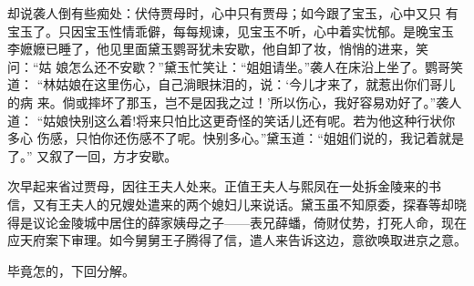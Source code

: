 却说袭人倒有些痴处：伏侍贾母时，心中只有贾母；如今跟了宝玉，心中又只
有宝玉了。只因宝玉性情乖僻，每每规谏，见宝玉不听，心中着实忧郁。是晚宝玉
李嬷嬷已睡了，他见里面黛玉鹦哥犹未安歇，他自卸了妆，悄悄的进来，笑问：“姑
娘怎么还不安歇？”黛玉忙笑让：“姐姐请坐。”袭人在床沿上坐了。鹦哥笑道：
“林姑娘在这里伤心，自己淌眼抹泪的，说：‘今儿才来了，就惹出你们哥儿的病
来。倘或摔坏了那玉，岂不是因我之过！’所以伤心，我好容易劝好了。”袭人道：
“姑娘快别这么着!将来只怕比这更奇怪的笑话儿还有呢。若为他这种行状你多心
伤感，只怕你还伤感不了呢。快别多心。”黛玉道：“姐姐们说的，我记着就是了。”
又叙了一回，方才安歇。

次早起来省过贾母，因往王夫人处来。正值王夫人与熙凤在一处拆金陵来的书
信，又有王夫人的兄嫂处遣来的两个媳妇儿来说话。黛玉虽不知原委，探春等却晓
得是议论金陵城中居住的薛家姨母之子——表兄薛蟠，倚财仗势，打死人命，现在
应天府案下审理。如今舅舅王子腾得了信，遣人来告诉这边，意欲唤取进京之意。

毕竟怎的，下回分解。